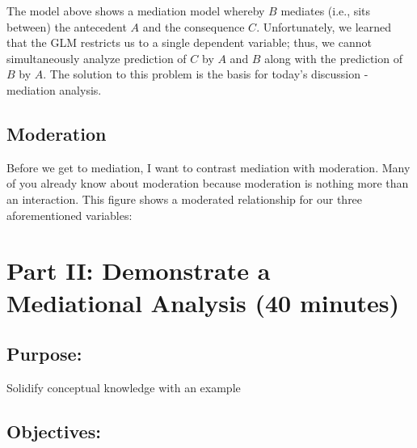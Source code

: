 \documentclass[12pt]{article}
\begin{document}
The model above shows a mediation model whereby $B$ mediates (i.e.,
sits between) the antecedent $A$ and the consequence $C$.
Unfortunately, we learned that the GLM restricts us to a single
dependent variable; thus, we cannot simultaneously analyze prediction
of $C$ by $A$ and $B$ along with the prediction of $B$ by $A$.  The
solution to this problem is the basis for today's discussion -
mediation analysis.

\subsection{Moderation}

Before we get to mediation, I want to contrast mediation with
moderation.  Many of you already know about moderation because
moderation is nothing more than an interaction.  This figure shows a
moderated relationship for our three aforementioned variables:

\begin{center}
\end{center}


\section{Part II: Demonstrate a Mediational Analysis (40 minutes)}

\hrulefill
\subsection{Purpose:} Solidify conceptual knowledge with an example

\subsection{Objectives:}
\end{document}
